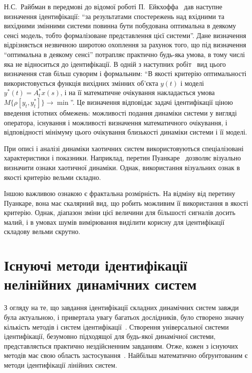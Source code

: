Н.С.~Райбман в передмові до відомої роботі
П.~Ейкхоффа~\cite{eykhoff_id_base} дав наступне визначення ідентифікації:
``за результатами спостережень над вхідними та вихідними
змінними системи повинна бути побудована оптимальна в
деякому сенсі модель, тобто формалізоване представлення цієї
системи''. Дане визначення відрізняється незвичною широтою
охоплення за рахунок того, що під визначення ``оптимальна в
деякому сенсі'' потрапляє практично будь-яка умова, в тому числі яка не
відноситься до ідентифікації. В одній з наступних
робіт~\cite{raibman_id_obj_ctl} вид цього визначення став більш суворим і
формальним: ``В якості критерію оптимальності використовується
функція вихідних змінних об'єкта
$y(t) $ і моделі
$y^{*}(t) = A_t^{*} x (s) $, і на її математичне очікування накладається
умова
$ M \{\rho [y_t, y_t^{*}] \} \to{\min} $''.
Це визначення
відповідає задачі ідентифікації ціною введення істотних
обмежень: можливості подання динаміки системи у вигляді
оператора, існування і можливості визначення математичного
очікування, і відповідності мінімуму цього очікування
близькості динаміки системи і її моделі.







При описі і аналізі динаміки хаотичних систем
використовуються спеціалізовані характеристики і
показники. Наприклад, перетин Пуанкаре~\cite{moon_chaotic_vibr,
anisch_complex_vibrations_in_simple_systems, atu_st105} дозволяє візуально визначити
ознаки хаотичної динаміки. Однак, використання візуальних
ознак в якості критерію вельми складно.

Іншою важливою ознакою є фрактальна розмірність. На відміну від
перетину Пуанкаре, вона має скалярний вид, що робить можливим
її використання в якості критерію. Однак, діапазон зміни цієї
величини для більшості сигналів досить малий, і в умовах шумів
вимірювання виділити корисну для ідентифікації складову
вельми скрутно.


\section{Існуючі методи ідентифікації нелінійних динамічних систем}%

З огляду на те, що завдання ідентифікації складних динамічних
систем завжди була актуальною, і привертала увагу багатьох
дослідників, було створено значну кількість методів і систем
ідентифікації~\cite{eykhoff_id_base, leondes_modern_tu, nelles_nlsys_id}. Створення
універсальної системи ідентифікації, безумовно підходящої
для будь-якої динамічної системи, представляється практично
нездійсненним завданням. Отже, кожен з існуючих методів має
свою область застосування~\cite{rastr_intro}. Найбільш математично
обґрунтованим є методи ідентифікації лінійних систем.

